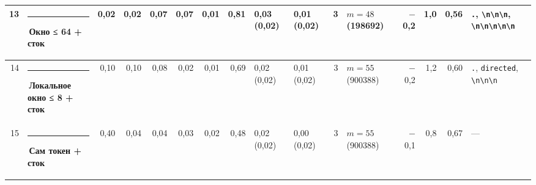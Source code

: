 \documentclass[10pt]{article}
\begin{document}
\begin{minipage}{\linewidth}
\begin{center}
{\begin{tabular}{|r|l|r|r|r|r|r|r|l|l|r|l|r|r|r|l|}
13 & \textcolor[HTML]{EDA100}{\rule{0.62em}{0.62em}}\,\textbf{Окно ≤ 64 + сток} & 0,02 & 0,02 & 0,07 & 0,07 & 0,01 & 0,81 & 0,03 (0,02) & 0,01 (0,02) & 3 & $m{=}48$ (198692) & $-$0,2 & 1,0 & 0,56 & \texttt{\textvisiblespace{}.}, \texttt{\textvisiblespace{}\textbackslash{}n\textbackslash{}n\textbackslash{}n}, \texttt{\textvisiblespace{}\textbackslash{}n\textbackslash{}n\textbackslash{}n\textbackslash{}n\textbackslash{}n} \\ \hline
14 & \textcolor[HTML]{1BAF7A}{\rule{0.62em}{0.62em}}\,\textbf{Локальное окно ≤ 8 + сток} & 0,10 & 0,10 & 0,08 & 0,02 & 0,01 & 0,69 & 0,02 (0,02) & 0,01 (0,02) & 3 & $m{=}55$ (900388) & $-$0,2 & 1,2 & 0,60 & \texttt{\textvisiblespace{}.}, \texttt{\textvisiblespace{}directed}, \texttt{\textvisiblespace{}\textbackslash{}n\textbackslash{}n\textbackslash{}n} \\ \hline
15 & \textcolor[HTML]{2A78D6}{\rule{0.62em}{0.62em}}\,\textbf{Сам токен + сток} & 0,40 & 0,04 & 0,04 & 0,03 & 0,02 & 0,48 & 0,02 (0,02) & 0,00 (0,02) & 3 & $m{=}55$ (900388) & $-$0,1 & 0,8 & 0,67 & — \\ \hline
\hline\end{tabular}}\end{center}
\end{minipage}
\par\vspace{0.4em}
\end{document}
